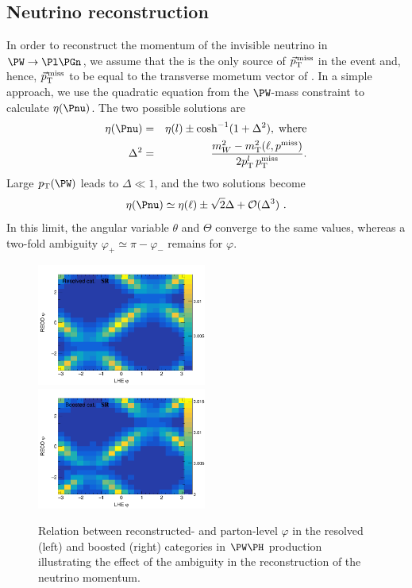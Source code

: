 \documentclass[a4paper,11pt]{article}
\begin{document}
\subsection{Neutrino reconstruction}
\label{sec:neu_reco}

In order to reconstruct the momentum of the invisible neutrino in $\PW\rightarrow\Pl\Pgn$, we assume that the \Pnu is the only source of ${\vec p}_{\mathrm{T}}^{\kern1pt\text{miss}}$ in the event and, hence, ${\vec p}_{\mathrm{T}}^{\kern1pt\text{miss}}$ to be equal to the transverse mometum vector of \Pnu. 
In a simple approach, we use the quadratic equation from the $\PW$-mass constraint to calculate $\eta(\Pnu)$. 
The two possible solutions are
\begin{eqnarray}
\eta(\Pnu) &=& {\eta}(l) \pm \cosh^{-1}(1+{\Delta}^2),\;\textrm{where}\label{Eq:NeuEta}\\
{\Delta}^2 &=& \frac{m_W^2 - m_\textrm{T}^2 (\ell,{p^\text{miss}\xspace})}{2 p_\textrm{T}^{l}\, p_\textrm{T}^\textrm{miss}}. 
\end{eqnarray}
Large $\pt(\PW)$ leads to $\Delta \ll 1$, and the two solutions become 
\begin{equation}
{\eta}(\Pnu) \simeq {\eta}(\ell) \pm \sqrt{2}{\Delta} + {\cal{O}} ({\Delta}^3)	\ .
\label{Eq:NeuEta2}
\end{equation}
In this limit,  the angular variable $\theta$ and $\Theta$ converge to the same values, whereas a two-fold ambiguity  $\varphi_{+} \simeq \pi - \varphi_{-}$ remains for $\varphi$. 
\begin{figure}[hbtp]
\begin{center}
\includegraphics[width=0.495\textwidth]{Figures/New/RECO/Resolved_Plot_2D_phi_unweighted.png}
\includegraphics[width=0.495\textwidth]{Figures/New/RECO/Boosted_Plot_2D_phi_unweighted.png}
\end{center}
\caption{
Relation between reconstructed- and parton-level $\varphi$ in the resolved (left) and boosted (right) categories in $\PW\PH$ production illustrating the effect of the ambiguity in the reconstruction of the neutrino momentum. 
}
\label{fig:neureco}
\end{figure}
\end{document}
